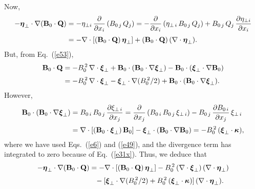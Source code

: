 \documentclass[12pt,prb,aps,notitlepage]{revtex4-1}
\newcommand{\bxi}{\mbox{\boldmath$\xi$}}
\newcommand{\bta}{\mbox{\boldmath$\eta$}}
\newcommand{\bkappa}{\mbox{\boldmath$\kappa$}}
\begin{document}
Now,
\begin{align}
-\bta_\perp\cdot\nabla ({\bf B}_0\cdot{\bf Q}) &= -\eta_{\perp i}\,\frac{\partial}{\partial x_i}\,(B_{0\,j}\,Q_j) = - \frac{\partial}{\partial x_i}\,(\eta_{\perp\,i}\,B_{0\,j}\,Q_j)+ B_{0\,j}\,Q_j\,\frac{\partial \eta_{\perp i}}{\partial x_i}\nonumber\\[0.5ex]
&= -\nabla\cdot[({\bf B}_0\cdot {\bf Q})\,\bta_\perp]  +({\bf B}_0\cdot{\bf Q})\,(\nabla\cdot\bta_\perp).
\end{align}
But, from Eq.~(\ref{e53}), 
\begin{align}
{\bf B}_0\cdot{\bf Q} &= - B_0^{\,2}\,\nabla\cdot\bxi_\perp + {\bf B}_0\cdot ({\bf B}_0\cdot\nabla\bxi_\perp) - {\bf B}_0\cdot
(\bxi_\perp\cdot\nabla {\bf B}_0)\nonumber\\[0.5ex]
&=- B_0^{\,2}\,\nabla\cdot\bxi_\perp - \bxi_\perp\cdot\nabla(B_0^{\,2}/2) + {\bf B}_0\cdot ({\bf B}_0\cdot\nabla\bxi_\perp).
\end{align}
However,
\begin{align}
 {\bf B}_0\cdot ({\bf B}_0\cdot\nabla\bxi_\perp) &= 
 B_{0\,i}\,B_{0\,j}\,\frac{\partial \xi_{\perp\,i}}{\partial x_j}= \frac{\partial}{\partial x_j}\,(B_{0\,i}\,B_{0\,j}\,\xi_{\perp\,i})- B_{0\,j} \,\frac{\partial B_{0\,i}}{\partial x_j}\,\xi_{\perp\,i}\nonumber\\[0.5ex]
 &= \nabla\cdot[({\bf B}_0\cdot\bxi_\perp)\,{\bf B}_0] - \bxi_\perp\cdot({\bf B}_0\cdot\nabla{\bf B}_0) = -B_0^{\,2}\,(\bxi_\perp\cdot\bkappa),
 \end{align}
 where we have  used Eqs.~(\ref{e6}) and (\ref{e49}), and the divergence term has  integrated to zero because of Eq.~(\ref{e31x}). 
 Thus, we deduce that
 \begin{align}\label{e60}
 -\bta_\perp\cdot\nabla ({\bf B}_0\cdot{\bf Q})& = -\nabla\cdot[({\bf B}_0\cdot {\bf Q})\,\bta_\perp]   -B_0^{\,2}\,(\nabla\cdot\bxi_\perp)\,(\nabla\cdot\bta_\perp)
 \nonumber\\[0.5ex]
 &\phantom{=}-[\bxi_\perp\cdot\nabla(B_0^{\,2}/2) + B_0^{\,2}\,(\bxi_\perp\cdot\bkappa)]\,(\nabla\cdot\bta_\perp).
 \end{align}
 
\end{document}
